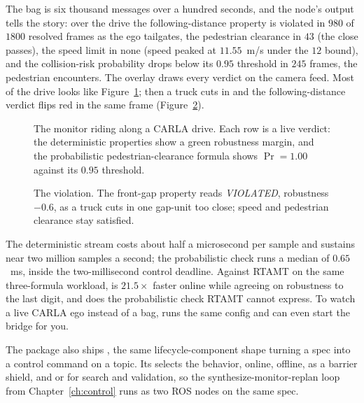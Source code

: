 The bag is six thousand messages over a hundred seconds, and the node's output tells the story: over the drive the following-distance property is violated in $980$ of $1800$ resolved frames as the ego tailgates, the pedestrian clearance in $43$ (the close passes), the speed limit in none (speed peaked at $11.55$~m/s under the $12$ bound), and the collision-risk probability drops below its $0.95$ threshold in $245$ frames, the pedestrian encounters. The overlay draws every verdict on the camera feed. Most of the drive looks like Figure~\ref{fig:carla-ok}; then a truck cuts in and the following-distance verdict flips red in the same frame (Figure~\ref{fig:carla-viol}).

\begin{figure}[h]
\centering
{}
\caption{The monitor riding along a CARLA drive. Each row is a live verdict: the deterministic properties show a green robustness margin, and the probabilistic pedestrian-clearance formula shows $\Pr = 1.00$ against its $0.95$ threshold.}
\label{fig:carla-ok}
\end{figure}

\begin{figure}[h]
\centering
{}
\caption{The violation. The front-gap property reads \emph{VIOLATED}, robustness $-0.6$, as a truck cuts in one gap-unit too close; speed and pedestrian clearance stay satisfied.}
\label{fig:carla-viol}
\end{figure}

The deterministic stream costs about half a microsecond per sample and sustains near two million samples a second; the probabilistic check runs a median of $0.65$~ms, inside the two-millisecond control deadline. Against RTAMT on the same three-formula workload, \sentil{} is $21.5\times$ faster online while agreeing on robustness to the last digit, and does the probabilistic check RTAMT cannot express. To watch a live CARLA ego instead of a bag,  runs the same config and can even start the bridge for you.

\begin{notebox}
The package also ships , the same lifecycle-component shape turning a spec into a control command on a topic. Its  selects the behavior,  online,  offline,  as a barrier shield, and  or  for search and validation, so the synthesize-monitor-replan loop from Chapter~\ref{ch:control} runs as two ROS nodes on the same spec.
\end{notebox}